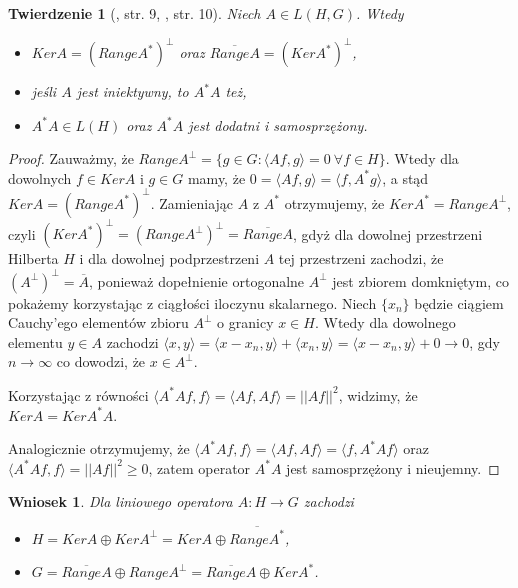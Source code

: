 \documentclass[man,mfiu]{mgrwms}
\newtheorem{tw}{Twierdzenie}[chapter]
\newtheorem{wn}{Wniosek}[chapter]
\begin{document}
\begin{tw}[\cite{iphde}, str. 9, \cite{kaipo}, str. 10] Niech $A\in L(H,G)$. Wtedy
\begin{itemize}
\vspace{2mm}
\item $KerA=(RangeA^*)^{\perp}$ oraz $\overline{RangeA}=(KerA^*)^{\perp}$,
\vspace{2mm}
\item jeśli $A$ jest iniektywny, to $A^*A$ też,
\vspace{2mm}
\item $A^*A\in L(H)$ oraz $A^*A$ jest dodatni i samosprzężony.
\vspace{2mm}
\end{itemize}
\end{tw}
\begin{proof}
Zauważmy, że $RangeA^{\perp}=\{g\in G\colon \langle Af,g\rangle =0\ \forall f\in H\}$. Wtedy dla dowolnych $f\in KerA$ i $g\in G$ mamy, że $0=\langle Af,g\rangle=\langle f,A^*g\rangle$, a stąd $KerA=(RangeA^*)^{\perp}$. Zamieniając $A$ z $A^*$ otrzymujemy, że $KerA^*=RangeA^{\perp}$, czyli $(KerA^*)^{\perp}=(RangeA^{\perp})^{\perp}=\overline{RangeA}$, gdyż dla dowolnej przestrzeni Hilberta $H$ i dla dowolnej podprzestrzeni $A$ tej przestrzeni zachodzi, że $(A^{\perp})^{\perp}=\overline{A}$, ponieważ dopełnienie ortogonalne $A^{\perp}$ jest zbiorem domkniętym, co pokażemy korzystając z ciągłości iloczynu skalarnego. Niech $\{x_n\}$ będzie ciągiem Cauchy'ego elementów zbioru $A^{\perp}$ o granicy $x\in H$. Wtedy dla dowolnego elementu $y\in A$ zachodzi $\langle x,y\rangle=\langle x-x_n,y\rangle + \langle x_n,y\rangle=\langle x-x_n,y\rangle + 0\to 0$, gdy $n\to \infty$ co dowodzi, że $x\in A^{\perp}$.

Korzystając z równości $\langle A^*Af,f\rangle=\langle Af,Af\rangle=||Af||^2$, widzimy, że $KerA=KerA^*A$.

Analogicznie otrzymujemy, że $\langle A^*Af,f\rangle=\langle Af,Af\rangle=\langle f, A^*Af\rangle$ oraz $\langle A^*Af, f\rangle=||Af||^2\geq 0$, zatem operator $A^*A$ jest samosprzężony i nieujemny.
\end{proof}
\begin{wn}Dla liniowego operatora $A\colon H \to G$ zachodzi
\begin{itemize}
\vspace{2mm}
\item $H=KerA \oplus KerA^{\perp}=KerA\oplus \overline{RangeA^*}$,
\vspace{2mm}
\item $G=\overline{RangeA}\oplus RangeA^{\perp}=\overline{RangeA}\oplus KerA^*$.
\vspace{2mm}
\end{itemize}
\end{wn}
\end{document}
